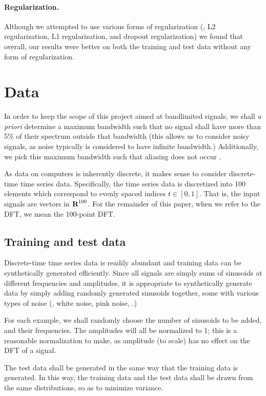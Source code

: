 \documentclass[12pt]{article}
\begin{document}
\paragraph{Regularization.} Although we attempted to use various forms of regularization (\ie, L2 regularization, 
L1 regularization, and dropout regularization) we found that overall, our results were better on both the training 
and test data without any form of regularization.

\section{Data}

In order to keep the scope of this project aimed at bandlimited signals, we shall \emph{a priori}
determine a maximum bandwidth such that no signal shall have more than 5\% of their spectrum outside
that bandwidth (this allows us to consider noisy signals, as noise typically is considered to have 
infinite bandwidth.) Additionally, we pick this maximum bandwidth such that aliasing does not 
occur \cite{OS:99}.

As data on computers is inherently discrete, it makes sense to consider discrete-time time series data.
Specifically, the time series data is discretized into 100 elements which correspond to evenly spaced 
indices $t \in [0,1]$. That is, the input signals are vectors in ${\mbox{\bf R}}^{100}$. For the remainder of
this paper, when we refer to the DFT, we mean the 100-point DFT. 


\subsection{Training and test data} Discrete-time time series data is readily abundant and 
training data can be synthetically generated efficiently. Since all signals are simply sums of 
sinusoids at different frequencies and amplitudes, it is appropriate to synthetically generate
data by simply adding randomly generated sinusoids together, some with various types of noise 
(\eg, white noise, pink noise, \etc.)

For each example, we shall randomly choose the number of sinusoids 
to be added, and their frequencies. The amplitudes will all be normalized to 1; this is a reasonable 
normalization to make, as amplitude (to scale) has no effect on the DFT of a signal.

The test data shall be generated in the same way that the training data is
generated. In this way, the training data and the test data shall be drawn from the same distributions,
so as to minimize variance.
\end{document}
